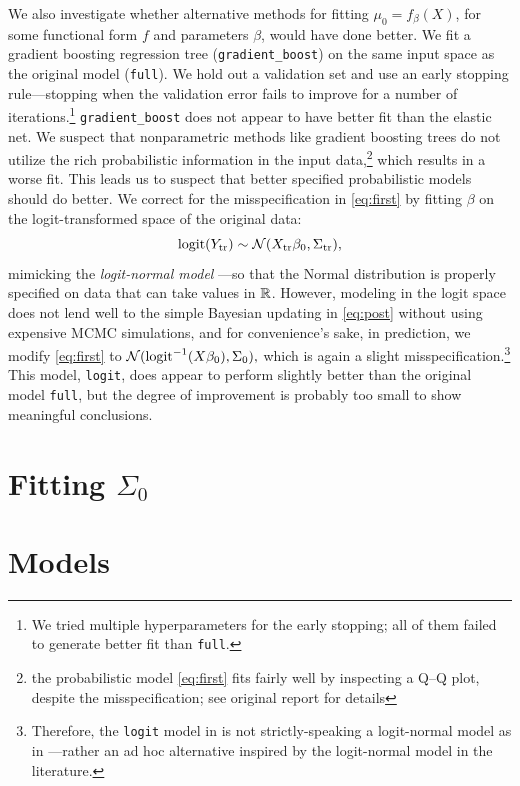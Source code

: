 \documentclass[12pt]{article}
\newcommand{\logit}{\operatorname{logit}}
\begin{document}
We also investigate whether alternative methods for fitting $\mu_0 =
f_\beta(X)$, for some functional form $f$ and parameters $\beta$, would have
done better. We fit a gradient boosting regression tree
(\texttt{gradient\_boost}) on the same input space as the original model
(\texttt{full}). We hold out a validation set and use an early stopping
rule---stopping when the validation error fails to improve for a number of
iterations.\footnote{We tried multiple hyperparameters for the early stopping;
all of them failed to generate better fit than \texttt{full}.}
\texttt{gradient\_boost} does not appear to have better fit than the elastic
net. We suspect that nonparametric methods like gradient boosting trees do not
utilize the rich probabilistic information in the input data,\footnote{the probabilistic
model \eqref{eq:first} fits fairly well by inspecting a Q--Q plot, despite the misspecification; see original
report for details} which results in a worse fit. This leads us to suspect that
better specified probabilistic models should do better. We correct for the
misspecification in \eqref{eq:first} by fitting $\beta$ on the logit-transformed
space of the original data: \[
\logit(Y_\text{tr}) \sim \Norm(X_\text{tr}\beta_0, \Sigma_\text{tr}),
\]
mimicking the \emph{logit-normal model} \cite[page 283]{agresti2015foundations}---so that the Normal distribution is properly specified on data that can take values in $\mathbb{R}$. However, modeling in the logit space does not lend well to the simple Bayesian updating in \eqref{eq:post} without using expensive MCMC simulations, and for convenience's sake, in prediction, we modify \eqref{eq:first} to $\Norm(\logit^{-1}(X\beta_0), \Sigma_0),$ which is again a slight misspecification.\footnote{Therefore, the \texttt{logit} model in  is not strictly-speaking a logit-normal model as in \cite{agresti2015foundations}---rather an ad hoc alternative inspired by the logit-normal model in the literature.} This model, \texttt{logit}, does appear to perform slightly better than the original model \texttt{full}, but the degree of improvement is probably too small to show meaningful conclusions.  

\section{Fitting $\Sigma_0$}
\label{sec:sigma}

\section{Models}
\end{document}
